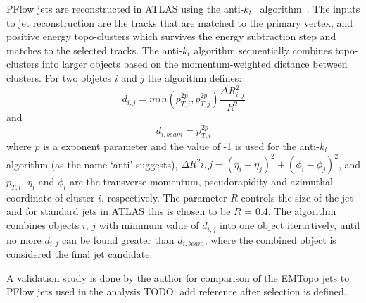 PFlow jets are reconstructed in ATLAS 
using the anti-$k_t$~\cite{Cacciari_2008} algorithm~\cite{PERF-2015-09}. 
The inputs to jet reconstruction are 
the tracks that are matched to the primary vertex,
and positive energy topo-clusters which survives the energy subtraction step 
and matches to the selected tracks. 
The anti-$k_t$ algorithm 
sequentially combines topo-clusters into larger objects based on the 
momentum-weighted distance between clusters. 
For two objetcs $i$ and $j$ the algorithm defines:
\[  d_{i,j} = min(p_{T,i}^{2p},p_{T,j}^{2p}) \frac{\Delta R_{i,j}^2}{R^2} \]
and 
\[ d_{i,beam} = p_{T,i}^{2p} \]
where $p$ is a exponent parameter and the value of -1 is used
for the anti-$k_t$ algorithm (as the name `anti' suggests),
$\Delta R^2{i,j} = (\eta_i - \eta_j)^2 + (\phi_i - \phi_j)^2 $, 
and $p_{T,i}$, $\eta_i$ and $\phi_i$ are 
the transverse momentum, 
pseudorapidity and azimuthal coordinate
of cluster $i$, respectively. 
The parameter $R$ controls the size of the jet and for standard jets 
in ATLAS this is chosen to be $R$ = 0.4.
The algorithm combines objects $i$, $j$ with minimum value of $d_{i,j}$
into one object iterartively, until no more $d_{i,j}$ can be found greater
than $d_{i,beam}$, where the combined object is considered the final jet 
candidate.

A validation study is done by the author for comparison of the EMTopo jets 
to PFlow jets used in the analysis TODO: add reference after selection is defined.

